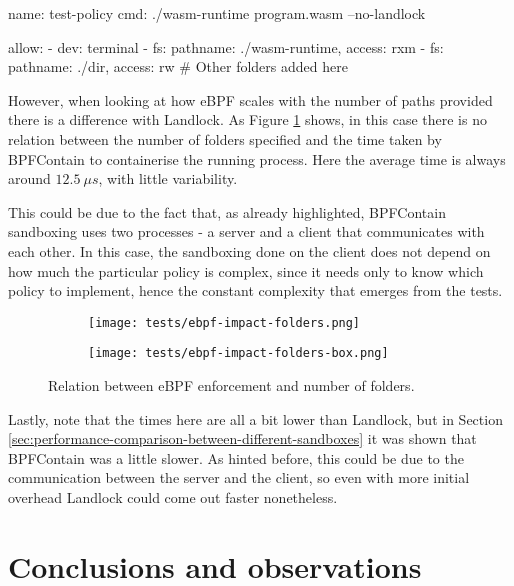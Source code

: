 \vspace*{0.5cm}
\begin{code}[language=yaml, caption=The outline of the policy used for eBPF tests., label=lst:ebpf-impact-policy-outline]
name: test-policy
cmd: ./wasm-runtime program.wasm --no-landlock

allow:
- dev: terminal
- fs: {pathname: ./wasm-runtime, access: rxm}
- fs: {pathname: ./dir, access: rw}
# Other folders added here
\end{code}

However, when looking at how eBPF scales with the number of paths provided there is a difference
with Landlock. As Figure \ref{fig:perf-test-ebpf-impact-folders} shows, in this case there is no relation between the number
of folders specified and the time taken by BPFContain to containerise the running process.
Here the average time is always around $12.5\ \mu s$, with little variability.

This could be due to the fact that, as already highlighted, BPFContain sandboxing uses two
processes - a server and a client that communicates with each other.
In this case, the sandboxing done on the client does not depend on how much
the particular policy is complex, since it needs only to know which policy to implement, hence the constant
complexity that emerges from the tests.

\begin{figure}[hbt!]
  \centering
  \begin{subfigure}[b]{0.49\textwidth}
    \texttt{[image: tests/ebpf-impact-folders.png]}
  \end{subfigure}
  \begin{subfigure}[b]{0.49\textwidth}
    \texttt{[image: tests/ebpf-impact-folders-box.png]}
  \end{subfigure}

  \caption{Relation between eBPF enforcement and number of folders.}
  \label{fig:perf-test-ebpf-impact-folders}
\end{figure}

Lastly, note that the times here are all a bit lower than Landlock, but in Section \ref{sec:performance-comparison-between-different-sandboxes}
it was shown that BPFContain was a little slower. As hinted before, this could be due to the communication
between the server and the client, so even with more initial overhead Landlock could come out
faster nonetheless.

\clearpage
\section{Conclusions and observations}

